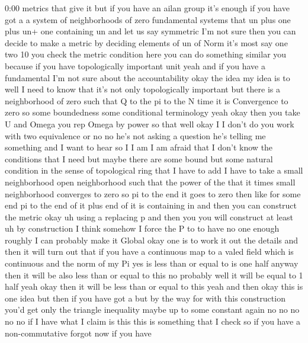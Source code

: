 \begin{unfinished}{0:00}
metrics  that  give  it  but  if  you  have  an
ailan  group  it's  enough  if  you  have  got
a  a  system  of  neighborhoods  of  zero
fundamental  systems  that  un  plus  one
plus  un+  one  containing  un  and  let  us
say  symmetric  I'm  not  sure  then  you  can
decide  to  make  a  metric  by  deciding
elements  of  un  of  Norm  it's  most  say  one
two  10  you  check  the  metric  condition
here  you  can  do  something  similar  you
because  if  you  have  topologically
important  unit  yeah  and  if  you  have  a
fundamental  I'm  not  sure  about  the
accountability  okay  the  idea  my  idea  is
to  well  I  need  to  know  that  it's  not
only  topologically  important  but  there
is  a  neighborhood  of  zero  such  that  Q  to
the  pi  to  the  N  time  it  is  Convergence
to  zero  so  some  boundedness  some
conditional  terminology  yeah  okay  then
you  take  U  and  Omega  you  rep  Omega  by
power  so  that  well  okay  I  I  don't  do  you
work  with  two  equivalence  or  no  no  he's
not  asking  a  question  he's  telling  me
something  and  I  want  to  hear  so  I  I  am  I
am  afraid  that  I  don't  know  the
conditions  that  I  need  but  maybe  there
are  some  bound  but  some  natural
condition  in  the  sense  of  topological
ring  that  I  have  to  add  I  have  to  take  a
small  neighborhood  open  neighborhood
such  that  the  power  of  the  that  it  times
small  neighborhood  converges  to  zero  so
pi  to  the  end  it  goes  to  zero  then  like
for  some  end  pi  to  the  end  of  it  plus
end  of  it  is  containing  in  and  then  you
can  construct  the  metric  okay  uh  using  a
replacing  p  and  then  you  you  will
construct  at  least
uh  by  construction  I  think  somehow  I
force  the  P  to  to  have  no  one  enough
roughly  I  can  probably  make  it  Global
okay  one  is  to  work  it  out  the  details
and  then  it  will  turn  out  that  if  you
have  a
continuous  map  to  a  valed  field  which  is
continuous  and  the  norm  of  my  Pi  yes  is
less  than  or  equal
to  is  one  half  anyway  then  it  will  be
also  less  than  or  equal  to  this  no
probably  well  it  will  be  equal  to  1  half
yeah  okay  then  it  will  be  less  than  or
equal  to  this  yeah  and
then  okay  this  is  one  idea  but  then  if
you  have  got  a  but  by  the  way  for  with
this  construction  you'd  get  only  the
triangle  inequality  maybe  up  to  some
constant  again  no  no  no  no  no  if  I  have
what  I  claim  is  this  this  is  something
that  I  check  so  if  you  have  a
non-commutative  forgot  now  if  you  have

\end{unfinished}
